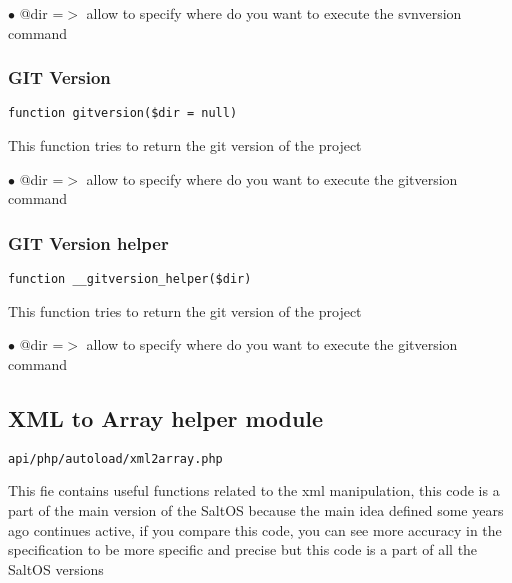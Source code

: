 \documentclass[a4paper]{article}
\begin{document}
\begin{compactitem}
\item[\color{myblue}$\bullet$] @dir =$>$ allow to specify where do you want to execute the svnversion command
\end{compactitem}

\hypertarget{toc271}{}
\subsubsection{GIT Version}

\begin{lstlisting}
function gitversion($dir = null)
\end{lstlisting}

This function tries to return the git version of the project

\begin{compactitem}
\item[\color{myblue}$\bullet$] @dir =$>$ allow to specify where do you want to execute the gitversion command
\end{compactitem}

\hypertarget{toc272}{}
\subsubsection{GIT Version helper}

\begin{lstlisting}
function __gitversion_helper($dir)
\end{lstlisting}

This function tries to return the git version of the project

\begin{compactitem}
\item[\color{myblue}$\bullet$] @dir =$>$ allow to specify where do you want to execute the gitversion command
\end{compactitem}

\hypertarget{toc273}{}
\subsection{XML to Array helper module}

\begin{lstlisting}
api/php/autoload/xml2array.php
\end{lstlisting}

This fie contains useful functions related to the xml manipulation, this code is a part of the
main version of the SaltOS because the main idea defined some years ago continues active, if you
compare this code, you can see more accuracy in the specification to be more specific and precise
but this code is a part of all the SaltOS versions
\end{document}
